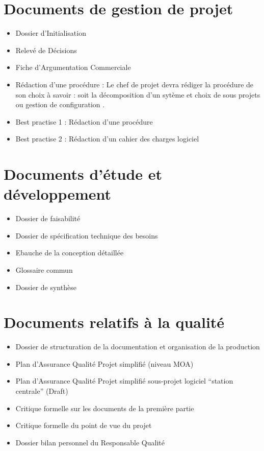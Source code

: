 \documentclass[a4paper]{article}
\begin{document}
\section{Documents de gestion de projet}

\begin{itemize}
\item Dossier d'Initialisation
\item Relevé de Décisions
\item Fiche d'Argumentation Commerciale 
\item Rédaction d'une procédure : Le chef de projet devra rédiger la procédure de son choix à savoir : soit la \og décomposition d'un sytème et choix de sous projets \fg ou \og gestion de configuration \fg.
\item Best practise 1 : Rédaction d'une procédure
\item Best practise 2 : Rédaction d'un cahier des charges logiciel
\end{itemize}


\section{Documents d’étude et développement}

\begin{itemize}
\item Dossier de faisabilité
\item Dossier de spécification technique des besoins
\item Ebauche de la conception détaillée
\item Glossaire commun
\item Dossier de synthèse
\end{itemize}

\section{Documents relatifs à la qualité}

\begin{itemize}
\item Dossier de structuration de la documentation et organisation de la production
\item Plan d'Assurance Qualité Projet simplifié (niveau MOA)
\item Plan d'Assurance Qualité Projet simplifié sous-projet logiciel ``station centrale'' (Draft)
\item Critique formelle sur les documents de la première partie
\item Critique formelle du point de vue du projet
\item Dossier bilan personnel du Responsable Qualité
\end{itemize}
\end{document}
